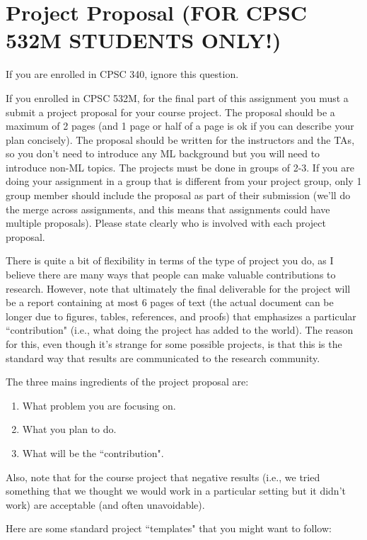 \documentclass{article}
\def\blu#1{{\color{blu}#1}}
\begin{document}
\section{Project Proposal (FOR CPSC 532M STUDENTS ONLY!)}

If you are enrolled in CPSC 340, ignore this question.

If you enrolled in CPSC 532M, for the final part of this assignment you must a \blu{submit a project proposal} for your course project. The proposal should be a maximum of 2 pages (and 1 page or half of a page is ok if you can describe your plan concisely). The proposal should be written for the instructors and the TAs, so you don't need to introduce any ML background but you will need to introduce non-ML topics. The projects must be done in groups of 2-3. If you are doing your assignment in a group that is different from your project group, only  1 group member should include the proposal as part of their submission (we'll do the merge across assignments, and this means that assignments could have multiple proposals). Please state clearly who is involved with each project proposal.

There is quite a bit of flexibility in terms of the type of project you do, as I believe there are many ways that people can make valuable contributions to research. However, note that ultimately the final deliverable for the project will be a report containing at most 6 pages of text (the actual document can be longer due to figures, tables, references, and proofs) that emphasizes a particular ``contribution" (i.e., what doing the project has added to the world).
The reason for this, even though it's strange for some possible projects, is that this is the standard way that results are communicated to the research community.

\blu{The three mains ingredients of the project proposal are:
\begin{enumerate}
\item What problem you are focusing on.
\item What you plan to do.
\item What will be the ``contribution".
\end{enumerate}
}
Also, note that for the course project that negative results (i.e., we tried something that we thought we would work in a particular setting but it didn't work) are acceptable (and often unavoidable).

Here are some standard project ``templates" that you might want to follow:
\end{document}

